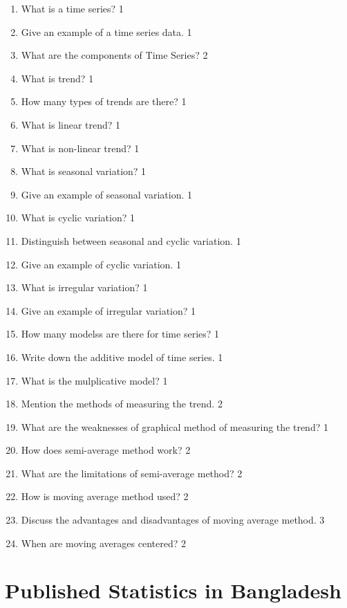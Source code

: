 \documentclass[a4paper,oneside]{book}
\begin{document}
  \begin{enumerate}
    \item What is a time series? \hfill 1
    \item Give an example of a time series data. \hfill 1
    \item What are the components of Time Series?   \hfill 2
    \item What is trend?  \hfill 1
    \item How many types of trends are there? \hfill 1
    \item What is linear trend?  \hfill 1
    \item What is non-linear trend? \hfill 1
    \item What is seasonal variation? \hfill 1
    \item Give an example of seasonal variation. \hfill 1
    \item What is cyclic variation?  \hfill 1
    \item Distinguish between seasonal and cyclic variation. \hfill 1
    \item Give an example of cyclic variation. \hfill 1
    \item What is irregular variation? \hfill 1
    \item Give an example of irregular variation? \hfill 1
    \item How many modelss are there for time series? \hfill 1
    \item Write down the additive model of time series. \hfill 1
    \item What is the mulplicative model? \hfill 1
    \item Mention the methods of measuring the trend. \hfill 2
    \item What are the weaknesses of graphical method of measuring the trend? \hfill 1
    \item How does semi-average method work? \hfill 2
    \item What are the limitations of semi-average method? \hfill 2
    \item How is moving average method used?  \hfill 2
    \item Discuss the advantages and disadvantages of moving average method. \hfill 3
    \item When are moving averages centered? \hfill 2
    
     \end{enumerate}

\chapter{Published Statistics in Bangladesh} 
\end{document}
